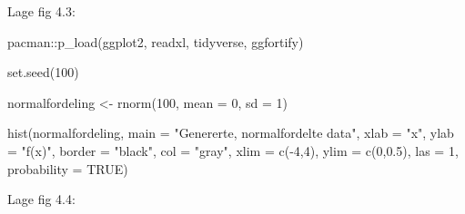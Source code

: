 \documentclass[
]{book}
\newenvironment{Shaded}{\begin{snugshade}}{\end{snugshade}}
\newcommand{\AttributeTok}[1]{\textcolor[rgb]{0.77,0.63,0.00}{#1}}
\newcommand{\ConstantTok}[1]{\textcolor[rgb]{0.00,0.00,0.00}{#1}}
\newcommand{\DecValTok}[1]{\textcolor[rgb]{0.00,0.00,0.81}{#1}}
\newcommand{\FloatTok}[1]{\textcolor[rgb]{0.00,0.00,0.81}{#1}}
\newcommand{\FunctionTok}[1]{\textcolor[rgb]{0.00,0.00,0.00}{#1}}
\newcommand{\NormalTok}[1]{#1}
\newcommand{\OtherTok}[1]{\textcolor[rgb]{0.56,0.35,0.01}{#1}}
\newcommand{\SpecialCharTok}[1]{\textcolor[rgb]{0.00,0.00,0.00}{#1}}
\newcommand{\StringTok}[1]{\textcolor[rgb]{0.31,0.60,0.02}{#1}}
\begin{document}
Lage fig 4.3:

\begin{Shaded}
\begin{Highlighting}[]
\NormalTok{pacman}\SpecialCharTok{::}\FunctionTok{p\_load}\NormalTok{(ggplot2, readxl, tidyverse, ggfortify)}

\FunctionTok{set.seed}\NormalTok{(}\DecValTok{100}\NormalTok{)}

\NormalTok{normalfordeling }\OtherTok{\textless{}{-}} \FunctionTok{rnorm}\NormalTok{(}\DecValTok{100}\NormalTok{, }\AttributeTok{mean =} \DecValTok{0}\NormalTok{, }\AttributeTok{sd =} \DecValTok{1}\NormalTok{)}

\FunctionTok{hist}\NormalTok{(normalfordeling, }
     \AttributeTok{main =} \StringTok{"Genererte, normalfordelte data"}\NormalTok{, }
     \AttributeTok{xlab =} \StringTok{"x"}\NormalTok{, }
     \AttributeTok{ylab =} \StringTok{"f(x)"}\NormalTok{,}
     \AttributeTok{border =} \StringTok{"black"}\NormalTok{, }
     \AttributeTok{col =} \StringTok{"gray"}\NormalTok{,}
     \AttributeTok{xlim =} \FunctionTok{c}\NormalTok{(}\SpecialCharTok{{-}}\DecValTok{4}\NormalTok{,}\DecValTok{4}\NormalTok{),}
     \AttributeTok{ylim =} \FunctionTok{c}\NormalTok{(}\DecValTok{0}\NormalTok{,}\FloatTok{0.5}\NormalTok{),}
     \AttributeTok{las =} \DecValTok{1}\NormalTok{, }
     \AttributeTok{probability =} \ConstantTok{TRUE}\NormalTok{)}
\end{Highlighting}
\end{Shaded}

Lage fig 4.4:
\end{document}
